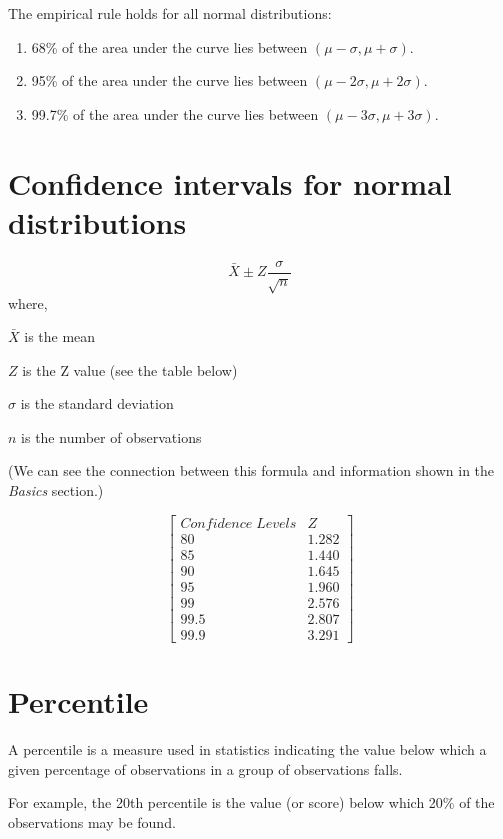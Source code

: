 \documentclass[]{book}
\begin{document}
The empirical rule holds for all normal distributions:

\begin{enumerate}
\def\labelenumi{(\arabic{enumi})}
\item
  68\% of the area under the curve lies between \((\mu-\sigma,\mu+\sigma)\).
\item
  95\% of the area under the curve lies between \((\mu-2\sigma,\mu+2\sigma)\).
\item
  99.7\% of the area under the curve lies between \((\mu-3\sigma,\mu+3\sigma)\).
\end{enumerate}

\hypertarget{confidence-intervals-for-normal-distributions}{%
\section{Confidence intervals for normal distributions}\label{confidence-intervals-for-normal-distributions}}

\[\bar{X} \pm Z \frac{\sigma}{\sqrt{n}}\]
where,

\(\bar{X}\) is the mean

\(Z\) is the Z value (see the table below)

\(\sigma\) is the standard deviation

\(n\) is the number of observations

(We can see the connection between this formula and information shown in the \emph{Basics} section.)

\[\begin{bmatrix}
Confidence \; Levels & Z \\
80  & 1.282 \\
85 & 1.440 \\
90 & 1.645 \\
95 & 1.960 \\
99 & 2.576 \\
99.5 & 2.807 \\
99.9 & 3.291 \end{bmatrix}\]

\hypertarget{percentile}{%
\section{Percentile}\label{percentile}}

A percentile is a measure used in statistics indicating the value below which a given percentage of observations in a group of observations falls.

For example, the 20th percentile is the value (or score) below which 20\% of the observations may be found.
\end{document}
